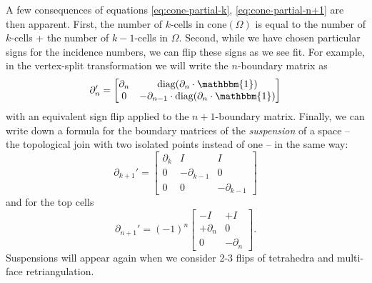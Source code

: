 \documentclass[twocolumn]{article}
\begin{document}
A few consequences of equations \eqref{eq:cone-partial-k}, \eqref{eq:cone-partial-n+1} are then apparent.
First, the number of $k$-cells in $\text{cone}(\Omega)$ is equal to the number of $k$-cells + the number of $k - 1$-cells in $\Omega$.
Second, while we have chosen particular signs for the incidence numbers, we can flip these signs as we see fit.
For example, in the vertex-split transformation we will write the $n$-boundary matrix as
\begin{equation}
    \partial_n' = \left[\begin{matrix}\partial_n & \text{diag}(\partial_n\cdot\mathbbm{1}) \\ 0 & -\partial_{n - 1}\cdot\text{diag}(\partial_n\cdot\mathbbm{1})\end{matrix}\right]
\end{equation}
with an equivalent sign flip applied to the $n + 1$-boundary matrix.
Finally, we can write down a formula for the boundary matrices of the \emph{suspension} of a space -- the topological join with two isolated points instead of one -- in the same way:
\begin{equation}
    \partial_{k + 1}' = \left[\begin{matrix}\partial_k & I & I \\ 0 & -\partial_{k - 1} & 0 \\ 0 & 0 & -\partial_{k - 1}\end{matrix}\right]
\end{equation}
and for the top cells
\begin{equation}
    \partial_{n + 1}' = (-1)^n\left[\begin{matrix}-I & +I \\ +\partial_n & 0 \\ 0 & -\partial_n\end{matrix}\right].
\end{equation}
Suspensions will appear again when we consider 2-3 flips of tetrahedra and multi-face retriangulation.
\end{document}
